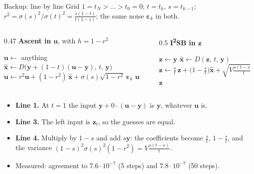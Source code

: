 \documentclass[aspectratio=169, 11pt]{beamer}
\newcommand{\y}{\bm{y}}
\newcommand{\z}{\bm{z}}
\newcommand{\uu}{\bm{u}}
\newcommand{\eps}{\bm{\varepsilon}}
\newcommand{\hx}{\hat{\bm{x}}}
\newcommand{\D}{D}
\begin{document}
\begin{frame}{Backup: line by line}
\footnotesize
Grid $1 = t_N>\dots>t_0 = 0$; $t=t_k$, $s=t_{k-1}$; $r^2 = \sigma(s)^2/\sigma(t)^2 =
\frac{s(1-t)}{t(1-s)}$; the same noise $\eps_k$ in both.

\medskip
\begin{columns}[T]
\begin{column}{0.47\textwidth}
\textbf{Ascent in $\uu$}, with $h = 1-r^2$
\begin{algorithmic}[1]
\State $\uu \gets$ anything 
  \State $\hx \gets \D\big(\y + (1-t)(\uu-\y),\,t,\,\y\big)$
  \State $\uu \gets r^2\uu + (1-r^2)\,\hx + \sigma(s)\sqrt{1-r^2}\,\eps_k$
\EndFor
\State \Return $\uu$
\end{algorithmic}
\end{column}
\begin{column}{0.5\textwidth}
\textbf{I\textsuperscript{2}SB in $\z$}
\begin{algorithmic}[1]
\State $\z \gets \y$
  \State $\hx \gets \D(\z,\,t,\,\y)$
  \State $\z \gets \tfrac st\,\z + \big(1-\tfrac st\big)\hx + \sqrt{V\tfrac{s(t-s)}{t}}\,\eps_k$
\EndFor
\State \Return $\z$
\end{algorithmic}
\end{column}
\end{columns}

\medskip
\begin{itemize}
  \item \textbf{Line 1.} At $t=1$ the input $\y + 0\cdot(\uu-\y)$ is $\y$, whatever $\uu$ is.
  \item \textbf{Line 3.} The left input is $\z_t$, so the guesses are equal.
  \item \textbf{Line 4.} Multiply by $1-s$ and add $s\y$: the coefficients become
        $\tfrac st$, $1-\tfrac st$, and the variance
        $(1-s)^2\sigma(s)^2(1-r^2) = V\tfrac{s(t-s)}{t}$.
  \item Measured: agreement to $7.6\cdot10^{-7}$ (5 steps) and $7.8\cdot10^{-7}$ (50 steps).
\end{itemize}
\end{frame}
\end{document}
